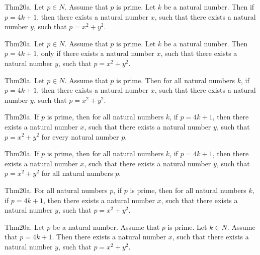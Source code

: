 \documentclass{article}
\begin{document}
Thm20a. Let $p \in N$. Assume that $p$ is prime. Let $k$ be a natural number. Then if $p = 4 k + 1$, then there exists a natural number $x$, such that there exists a natural number $y$, such that $p = x ^{ 2}+ y ^{ 2}$.

Thm20a. Let $p \in N$. Assume that $p$ is prime. Let $k$ be a natural number. Then $p = 4 k + 1$, only if there exists a natural number $x$, such that there exists a natural number $y$, such that $p = x ^{ 2}+ y ^{ 2}$.

Thm20a. Let $p \in N$. Assume that $p$ is prime. Then for all natural numbers $k$, if $p = 4 k + 1$, then there exists a natural number $x$, such that there exists a natural number $y$, such that $p = x ^{ 2}+ y ^{ 2}$.

Thm20a. If $p$ is prime, then for all natural numbers $k$, if $p = 4 k + 1$, then there exists a natural number $x$, such that there exists a natural number $y$, such that $p = x ^{ 2}+ y ^{ 2}$ for every natural number $p$.

Thm20a. If $p$ is prime, then for all natural numbers $k$, if $p = 4 k + 1$, then there exists a natural number $x$, such that there exists a natural number $y$, such that $p = x ^{ 2}+ y ^{ 2}$ for all natural numbers $p$.

Thm20a. For all natural numbers $p$, if $p$ is prime, then for all natural numbers $k$, if $p = 4 k + 1$, then there exists a natural number $x$, such that there exists a natural number $y$, such that $p = x ^{ 2}+ y ^{ 2}$.

Thm20a. Let $p$ be a natural number. Assume that $p$ is prime. Let $k \in N$. Assume that $p = 4 k + 1$. Then there exists a natural number $x$, such that there exists a natural number $y$, such that $p = x ^{ 2}+ y ^{ 2}$.
\end{document}
